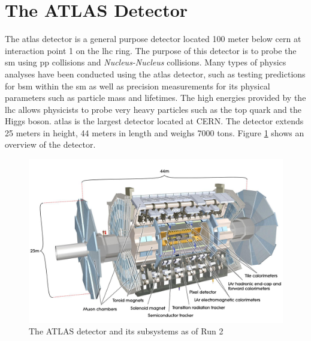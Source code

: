 \section{The ATLAS Detector}

The \gls{atlas} detector is a general purpose detector located 100 meter below \gls{cern} at interaction point 1 on the \gls{lhc} ring.
The purpose of this detector is to probe the \gls{sm} using \gls{pp} collisions and \textit{Nucleus-Nucleus} collisions. Many types of physics 
analyses have been conducted using the \gls{atlas} detector, such as testing predictions for \gls{bsm} within the \gls{sm} as well as precision measurements for 
its physical parameters such as particle mass and lifetimes. The high energies provided by the \gls{lhc} allows physicists to probe very heavy particles such as the 
top quark and the Higgs boson. \gls{atlas} is the largest detector located at CERN. The detector extends 25 meters in height,
44 meters in length and weighs 7000 tons. Figure \ref{fig:3.4} shows an overview of the detector.
\par

\begin{figure}[h]
  \centering
  \includegraphics[scale=0.6]{figs/ch3/atlas_run2.png}
  \caption{ The ATLAS detector and its subsystems as of Run 2 \cite{atlas}}
\label{fig:3.4}
\end{figure}

